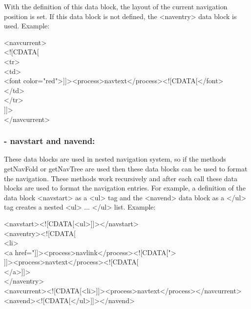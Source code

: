   With the definition of this data block, the layout of the current 
navigation position is set. If this data block is not defined, the 
{\tag <naventry>} data block is used. Example: \\

  \begin{xml}
  <navcurrent> \\
  <![CDATA[ \\
  <tr> \\
  \xtaba <td> \\
  \xtabb   <font color="red">]]><process>navtext</process><![CDATA[</font> \\
  \xtaba </td> \\
  </tr> \\
  ]]> \\
  </navcurrent> \\
  \end{xml}

\subsubsection{- navstart and navend:}  

  These data blocks are used in nested navigation system, so if the methods 
{\name getNavFold} or {\name getNavTree} are used then these data blocks 
can be used to format the navigation. These methods work recursively and 
after each call these data blocks are used to format the navigation entries. 
For example, a definition of the data block {\tag <navstart>} 
as a {\tag <ul>} tag and the {\tag <navend>} data block as a {\tag </ul>} 
tag creates a nested {\tag <ul>} ... {\tag </ul>} list. Example: \\

  \begin{xml}
  <navstart><![CDATA[<ul>]]></navstart> \\
  <naventry><![CDATA[ \\
    \xtaba <li> \\
    \xtaba <a href="]]><process>navlink</process><![CDATA["> \\
    \xtabb ]]><process>navtext</process><![CDATA[ \\
    \xtaba </a>]]> \\
  </naventry> \\
  <navcurrent><![CDATA[<li>]]><process>navtext</process></navcurrent> \\
  <navend><![CDATA[</ul>]]></navend> \\
  \end{xml}

